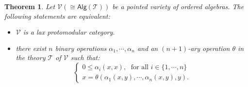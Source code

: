 \documentclass[11pt]{amsart}
\theoremstyle{plain}
\newtheorem{theorem}[subsection]{Theorem}
\theoremstyle{definition}
\theoremstyle{remark}
\newcommand{\V}{\ensuremath{\mathcal{V}}}
\newcommand{\T}{\ensuremath{\mathcal{T}}}
\newcommand{\Alg}[1]{\ensuremath{\mathsf{Alg}(#1)}}
\begin{document}
\begin{theorem}\label{lax proto ord-varieties} Let $\V(\cong \Alg{\T})$ be a pointed variety of ordered algebras. The following statements are equivalent:
\begin{itemize}
	\item[(i)] $\V$ is a lax protomodular category.
	\item[(ii)] there exist $n$ binary operations $\alpha_1,\cdots, \alpha_n$ and an $(n+1)$-ary operation $\theta$ in the theory $\T$ of $\V$ such that:
	\begin{equation}\label{inequalities for lax proto}
	\left\{\begin{array}{l}
		0\le \alpha_i(x,x), \;\mbox{ for all }i\in\{1, \cdots, n\} \\
		x=\theta(\alpha_1(x,y),\cdots, \alpha_n(x,y),y).
		\end{array}\right.
	\end{equation}
\end{itemize}
\end{theorem}
\end{document}
